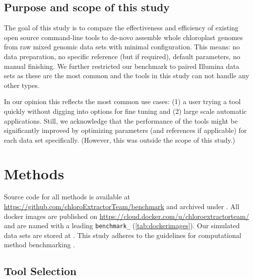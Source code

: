 \documentclass{bmcart}
\newcommand{\zenododataset}{\cite{zenododataset}}
\newcommand{\zenodorepo}{\cite{zenodorepo}}
\begin{document}
\subsection*{Purpose and scope of this study}
The goal of this study is to compare the effectiveness and efficiency of existing open source command-line tools to de-novo assemble whole chloroplast genomes from raw mixed genomic data sets with minimal configuration.
This means: no data preparation, no specific reference (but  if required), default parameters, no manual finishing.
We further restricted our benchmark to paired Illumina data sets as these are the most common  and the %
tools in this study can not handle any other types.

In our opinion this reflects the most common use cases: (1) a user trying a tool quickly without digging into options for fine tuning and (2) large scale automatic applications.
Still, we acknowledge that the performance of the tools might be significantly improved by optimizing parameters (and references if applicable) for each data set specifically.
(However, this was outside the scope of this study.)


\section*{Methods}
Source code for all methods is available at \url{https://github.com/chloroExtractorTeam/benchmark} and archived under \zenodorepo{}.
All docker images are published on \url{https://cloud.docker.com/u/chloroextractorteam/} and are named with a leading \texttt{benchmark\_} (\cref{tab:dockerimages}).
Our simulated data sets are stored at \zenododataset{}.
This study adheres to the guidelines for computational method benchmarking \cite{weber_essential_2018}.

\subsection*{Tool Selection}
\end{document}
